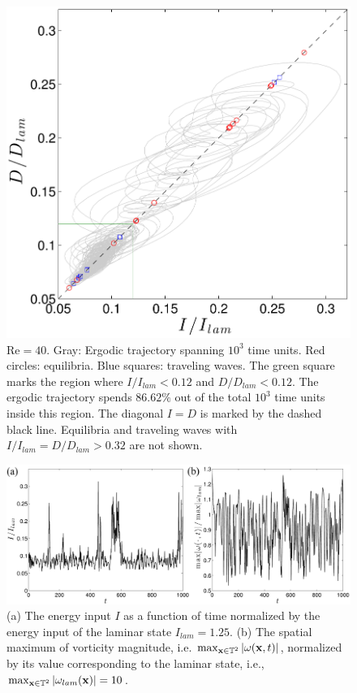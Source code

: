 \documentclass{jfm}
\begin{document}
\begin{figure}
\centering
\includegraphics[width=.75\textwidth]{ID_R40}		
\caption{$\mbox{Re}=40$. Gray: Ergodic trajectory spanning $10^3$ time units.
Red circles: equilibria.
Blue squares: traveling waves.
The green square marks the region where $I/I_{lam}<0.12$ and $D/D_{lam}<0.12$.
The ergodic trajectory spends $86.62\%$ out of the total $10^3$ time units inside this region.
The diagonal $I=D$ is marked by the dashed black line.
Equilibria and traveling waves with $I/I_{lam}=D/D_{lam}>0.32$ are not shown.
}
\label{fig:ID_R40}
\end{figure}
%
\begin{figure}
\centering
\includegraphics[width=\textwidth]{It}
\caption{(a) The energy input $I$ as a function of time normalized by the energy
input of the laminar state $I_{lam}=1.25$.
(b) The spatial maximum of
vorticity magnitude, i.e. $\max_{\mathbf x\in\mathbb T^2}|\omega(\mathbf x,t)|$, normalized by its value
corresponding to the laminar state, i.e.,
$\max_{\mathbf x\in\mathbb T^2}|\omega_{lam}(\mathbf x)|=10$.
}
\label{fig:It}
\end{figure}
\end{document}
